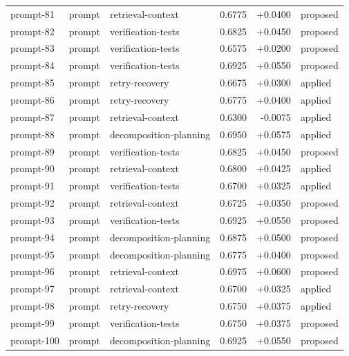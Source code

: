 \begin{center}
\begin{longtable}{llp{5.2cm}rrl}
prompt-81 & prompt & retrieval-context & 0.6775 & +0.0400 & proposed \\
prompt-82 & prompt & verification-tests & 0.6825 & +0.0450 & proposed \\
prompt-83 & prompt & verification-tests & 0.6575 & +0.0200 & proposed \\
prompt-84 & prompt & verification-tests & 0.6925 & +0.0550 & proposed \\
prompt-85 & prompt & retry-recovery & 0.6675 & +0.0300 & applied \\
prompt-86 & prompt & retry-recovery & 0.6775 & +0.0400 & applied \\
prompt-87 & prompt & retrieval-context & 0.6300 & -0.0075 & applied \\
prompt-88 & prompt & decomposition-planning & 0.6950 & +0.0575 & applied \\
prompt-89 & prompt & verification-tests & 0.6825 & +0.0450 & proposed \\
prompt-90 & prompt & retrieval-context & 0.6800 & +0.0425 & applied \\
prompt-91 & prompt & verification-tests & 0.6700 & +0.0325 & applied \\
prompt-92 & prompt & retrieval-context & 0.6725 & +0.0350 & proposed \\
prompt-93 & prompt & verification-tests & 0.6925 & +0.0550 & proposed \\
prompt-94 & prompt & decomposition-planning & 0.6875 & +0.0500 & proposed \\
prompt-95 & prompt & decomposition-planning & 0.6775 & +0.0400 & proposed \\
prompt-96 & prompt & retrieval-context & 0.6975 & +0.0600 & proposed \\
prompt-97 & prompt & retrieval-context & 0.6700 & +0.0325 & applied \\
prompt-98 & prompt & retry-recovery & 0.6750 & +0.0375 & applied \\
prompt-99 & prompt & verification-tests & 0.6750 & +0.0375 & proposed \\
prompt-100 & prompt & decomposition-planning & 0.6925 & +0.0550 & proposed \\
\bottomrule\end{longtable}\end{center}
\clearpage
